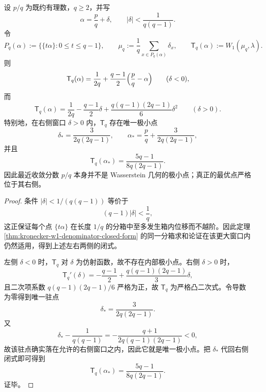 \begin{theorem}\label{thm:xi-kronecker-w1-right-shifted-minimizer}
设 \(p/q\) 为既约有理数，\(q\ge 2\)，并写
\[
\alpha=\frac{p}{q}+\delta,
\qquad
|\delta|<\frac{1}{q(q-1)}.
\]
令
\[
P_q(\alpha):=\{\{t\alpha\}:0\le t\le q-1\},
\qquad
\mu_q:=\frac{1}{q}\sum_{x\in P_q(\alpha)}\delta_x,
\qquad
\mathsf{T}_q(\alpha):=W_1(\mu_q,\lambda).
\]
则
\[
\mathsf{T}_q(\alpha)=\frac{1}{2q}+\frac{q-1}{2}\Bigl(\frac{p}{q}-\alpha\Bigr)
\qquad(\delta<0),
\]
而
\[
\mathsf{T}_q(\alpha)=\frac{1}{2q}-\frac{q-1}{2}\delta+\frac{q(q-1)(2q-1)}{6}\delta^2
\qquad(\delta>0).
\]
特别地，在右侧窗口 \(\delta>0\) 内，\(\mathsf{T}_q\) 存在唯一极小点
\[
\delta_*=\frac{3}{2q(2q-1)},
\qquad
\alpha_*=\frac{p}{q}+\frac{3}{2q(2q-1)},
\]
并且
\[
\mathsf{T}_q(\alpha_*)=\frac{5q-1}{8q(2q-1)}.
\]
因此最近收敛分数 \(p/q\) 本身并不是 Wasserstein 几何的极小点；真正的最优点严格位于其右侧。
\end{theorem}
\begin{proof}
条件 \(|\delta|<1/(q(q-1))\) 等价于
\[
(q-1)|\delta|<\frac{1}{q},
\]
这正保证每个点 \(\{t\alpha\}\) 在长度 \(1/q\) 的分箱中至多发生箱内位移而不越阶。因此定理 \ref{thm:kronecker-w1-denominator-closed-form} 的同一分箱求和论证在该更大窗口内仍然适用，得到上述左右两侧的闭式。

左侧 \(\delta<0\) 时，\(\mathsf{T}_q\) 对 \(\delta\) 为仿射函数，故不存在内部极小点。右侧 \(\delta>0\) 时，
\[
\mathsf{T}_q'(\delta)
=
-\frac{q-1}{2}+\frac{q(q-1)(2q-1)}{3}\delta,
\]
且二次项系数 \(q(q-1)(2q-1)/6\) 严格为正，故 \(\mathsf{T}_q\) 为严格凸二次式。令导数为零得到唯一驻点
\[
\delta_*=\frac{3}{2q(2q-1)}.
\]
又
\[
\delta_*-\frac{1}{q(q-1)}
=
-\frac{q+1}{2q(q-1)(2q-1)}<0,
\]
故该驻点确实落在允许的右侧窗口之内，因此它就是唯一极小点。把 \(\delta_*\) 代回右侧闭式即可得到
\[
\mathsf{T}_q(\alpha_*)=\frac{5q-1}{8q(2q-1)}.
\]
证毕。
\end{proof}

